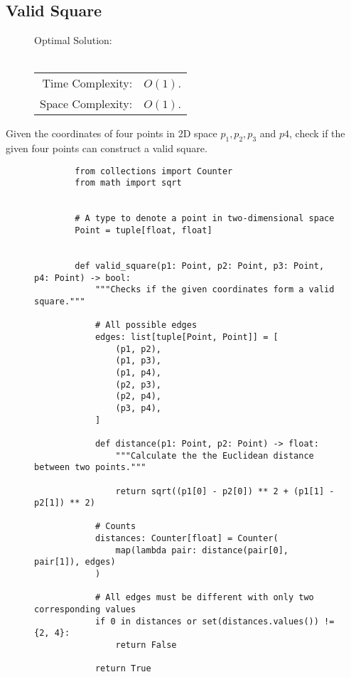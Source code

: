 
\subsection{Valid Square}

\begin{figure}[H]
    Optimal Solution:\\\\
    \begin{tabular}{rl}
        Time Complexity:& \(O(1)\).\\
        Space Complexity:& \(O(1)\).
    \end{tabular}
\end{figure}

Given the coordinates of four points in 2D space \(p_1, p_2, p_3\) and \(p4\),
check if the given four points can construct a valid square.

\begin{figure}[H]
    \centering
    \begin{verbatim}
        from collections import Counter
        from math import sqrt


        # A type to denote a point in two-dimensional space
        Point = tuple[float, float]


        def valid_square(p1: Point, p2: Point, p3: Point, p4: Point) -> bool:
            """Checks if the given coordinates form a valid square."""

            # All possible edges
            edges: list[tuple[Point, Point]] = [
                (p1, p2),
                (p1, p3),
                (p1, p4),
                (p2, p3),
                (p2, p4),
                (p3, p4),
            ]

            def distance(p1: Point, p2: Point) -> float:
                """Calculate the the Euclidean distance between two points."""

                return sqrt((p1[0] - p2[0]) ** 2 + (p1[1] - p2[1]) ** 2)

            # Counts
            distances: Counter[float] = Counter(
                map(lambda pair: distance(pair[0], pair[1]), edges)
            )

            # All edges must be different with only two corresponding values
            if 0 in distances or set(distances.values()) != {2, 4}:
                return False

            return True
    \end{verbatim}
\end{figure}
